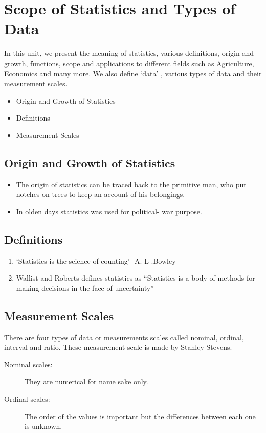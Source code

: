 \documentclass[12pt,a4paper]{article}
\begin{document}
	
	\section*{Scope of Statistics and Types of Data}
	In this unit, we present the meaning of statistics, various definitions, origin and
	growth, functions, scope and applications to different fields such as Agriculture, Economics
	and many more. We also define ‘data’ , various types of data and their measurement scales.
	\begin{itemize}
		\item Origin and Growth of Statistics
		\item Definitions
		\item Measurement Scales
	\end{itemize}
	\subsection*{Origin and Growth of Statistics}
	\begin{itemize}
		\item The origin of statistics can be traced back to the primitive man, who put notches on trees to
		keep an account of his belongings.
		\item In olden days statistics was used for political- war purpose.
	\end{itemize}
	\subsection*{Definitions}
	\begin{enumerate}
		\item‘Statistics is the science of counting’ -A. L .Bowley
		\item Wallist and Roberts defines statistics as “Statistics is a body of methods for making decisions in
		the face of uncertainty”
	\end{enumerate}
	\subsection*{Measurement Scales}
	There are four types of data or measurements scales called nominal, ordinal, interval
	and ratio. These measurement scale is made by Stanley Stevens.
	\begin{description}
		\item [Nominal scales:] They are numerical for name sake only.
		\item[Ordinal scales:] The order of the values is important but the differences between each one is
		unknown.
	\end{description}
	
\end{document}
